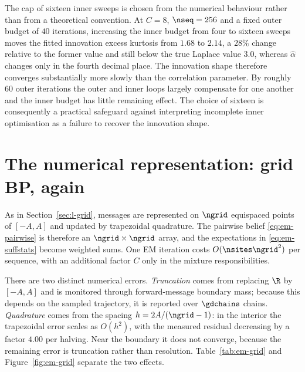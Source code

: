\begin{remark}\label{rmk:em-inner}
The cap of sixteen inner sweeps is chosen from the numerical behaviour rather
than from a theoretical convention. At $C=8$, $\nseq=256$ and a fixed outer
budget of $40$ iterations, increasing the inner budget from four to sixteen
sweeps moves the fitted innovation excess kurtosis from $1.68$ to $2.14$, a
$28\%$ change relative to the former value and still below the true Laplace
value $3.0$, whereas $\widehat\alpha$ changes only in the fourth decimal
place. The innovation shape therefore converges substantially more slowly than
the correlation parameter. By roughly $60$ outer iterations the outer and
inner loops largely compensate for one another and the inner budget has little
remaining effect. The choice of sixteen is consequently a practical safeguard
against interpreting incomplete inner optimisation as a failure to recover the
innovation shape.
\end{remark}


\section{The numerical representation: grid BP, again}
\label{sec:em-numerical}

As in Section~\ref{sec:l-grid}, messages are represented on $\ngrid$
equispaced points of $[-A,A]$ and updated by trapezoidal quadrature. The
pairwise belief \eqref{eq:em-pairwise} is therefore an
$\ngrid\times\ngrid$ array, and the expectations in
\eqref{eq:em-suffstats} become weighted sums. One EM iteration costs
$O(\nsites\ngrid^2)$ per sequence, with an additional factor $C$ only in the
mixture responsibilities.

There are two distinct numerical errors. \emph{Truncation} comes from replacing
$\R$ by $[-A,A]$ and is monitored through forward-message boundary mass;
because this depends on the sampled trajectory, it is reported over
$\gdchains$ chains. \emph{Quadrature} comes from the spacing
$h=2A/(\ngrid-1)$: in the interior the trapezoidal error scales as $O(h^2)$,
with the measured residual decreasing by a factor $4.00$ per halving. Near the
boundary it does not converge, because the remaining error is truncation rather
than resolution. Table~\ref{tab:em-grid} and Figure~\ref{fig:em-grid} separate
the two effects.

